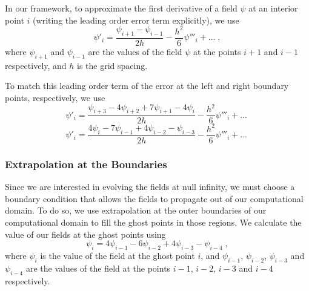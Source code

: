 In our framework, to approximate the first derivative of a field $\psi$ at an interior point $i$ (writing the leading order error term explicitly), we use 
%
\begin{equation}
    \psi'_i = \frac{\psi_{i+1} - \psi_{i-1}}{2h} - \frac{h^2}{6} \psi'''_i + ...\; ,
\end{equation}
%
where $\psi_{i+1}$ and $\psi_{i-1}$ are the values of the field $\psi$ at the points $i+1$ and $i-1$ respectively, and $h$ is the grid spacing. \cite{Pretorius_2002,Gautam_2021}

To match this leading order term of the error at the left and right boundary points, respectively, we use
%
\begin{equation}
    \psi'_i = \frac{\psi_{i+3} - 4 \psi_{i+2} + 7 \psi_{i+1} - 4 \psi_{i}}{2h} - \frac{h^2}{6} \psi'''_i + ...\;
\end{equation}
%
\begin{equation}
    \psi'_i = \frac{4 \psi_{i} - 7 \psi_{i-1} + 4 \psi_{i-2} - \psi_{i-3}}{2h} - \frac{h^2}{6} \psi'''_i + ...\;
\end{equation}


\subsubsection{Extrapolation at the Boundaries}

Since we are interested in evolving the fields at null infinity, we must choose a boundary condition that allows the fields to propagate out of our computational domain. To do so, we use extrapolation at the outer boundaries of our computational domain to fill the ghost points in those regions. We calculate the value of our fields at the ghost points using
%
\begin{equation}
    \psi_i = 4 \psi_{i-1} - 6 \psi_{i-2} + 4 \psi_{i-3} - \psi_{i-4} \; ,
\end{equation}
%
where $\psi_i$ is the value of the field at the ghost point $i$, and $\psi_{i-1}$, $\psi_{i-2}$, $\psi_{i-3}$ and $\psi_{i-4}$ are the values of the field at the points $i-1$, $i-2$, $i-3$ and $i-4$ respectively.

